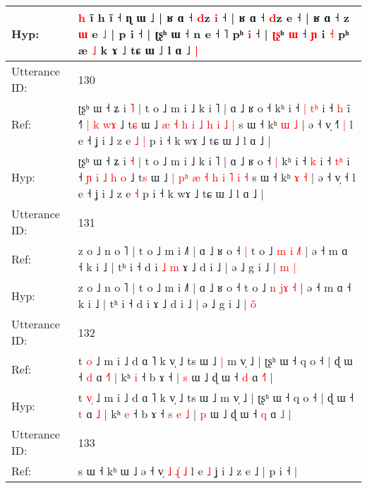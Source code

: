\documentclass[10pt]{article}
\DeclareRobustCommand{\hl}[1]{{\textcolor{red}{#1}}}
\begin{document}
\begin{longtable}{ll}
 \\
Hyp: & \hl{}\hl{h} i\hl{}\hl{}\hl{}\hl{}\hl{̃} h ĩ ˧ ɳ ɯ ˩ | ʁ ɑ ˧ \hl{d}z \hl{i} ˧ | ʁ ɑ ˧ \hl{d}z e ˧ | ʁ ɑ ˧ z\hl{ }\hl{ɯ} e \hl{˩} | p i ˧ | ʈʂʰ ɯ ˧ n e ˧\hl{}\hl{}\hl{}\hl{} ˥\hl{}\hl{} pʰ \hl{i} ˧\hl{} | \hl{ʈ}\hl{ʂ}ʰ \hl{}\hl{ɯ} ˧\hl{}\hl{}\hl{}\hl{} \hl{ɲ} i\hl{}\hl{} \hl{˧} pʰ æ\hl{}\hl{}\hl{} \hl{˩} k \hl{}ɤ ˩ tɕ ɯ ˩ l ɑ ˩\hl{ }\hl{|}
 \\
\midrule
Utterance ID: & 130 \\
Ref: & ʈʂʰ ɯ ˧ ʑ i \hl{˥} | t o ˩ m i ˩ k i ˥ | ɑ ˩ ʁ o ˧\hl{}\hl{} kʰ i ˧\hl{ }\hl{|} \hl{t}\hl{ʰ} i ˧ \hl{}\hl{h} i\hl{̃} ˧\hl{}\hl{˥} \hl{|} \hl{k} \hl{}\hl{w}\hl{ɤ} ˩ t\hl{ɕ} ɯ ˩ \hl{æ} \hl{}\hl{˧} \hl{h} \hl{i} \hl{˩} \hl{h} \hl{i} \hl{˩} \hl{|} s ɯ ˧ kʰ \hl{ɯ} \hl{˩} | ə ˧ v̩ ˧\hl{˥}\hl{ }\hl{|} l e ˧ ʝ i ˩ z e\hl{ }\hl{˩} \hl{|} p i ˧ k wɤ ˩ tɕ ɯ ˩ l ɑ ˩ |
 \\
Hyp: & ʈʂʰ ɯ ˧ ʑ i \hl{˧} | t o ˩ m i ˩ k i ˥ | ɑ ˩ ʁ o ˧\hl{ }\hl{|} kʰ i ˧\hl{}\hl{} \hl{}\hl{k} i ˧ \hl{t}\hl{ʰ} i\hl{} ˧\hl{ }\hl{ɲ} \hl{i} \hl{˩} \hl{h}\hl{ }\hl{o} ˩ t\hl{s} ɯ ˩ \hl{|} \hl{p}\hl{ʰ} \hl{æ} \hl{˧} \hl{h} \hl{i} \hl{˥} \hl{i} \hl{˧} s ɯ ˧ kʰ \hl{ɤ} \hl{˧} | ə ˧ v̩ ˧\hl{}\hl{}\hl{} l e ˧ ʝ i ˩ z e\hl{}\hl{} \hl{˧} p i ˧ k wɤ ˩ tɕ ɯ ˩ l ɑ ˩ |
 \\
\midrule
Utterance ID: & 131 \\
Ref: & z o ˩ n o ˥ | t o ˩ m i ˩˥ | ɑ ˩ ʁ o ˧\hl{ }\hl{|} t o ˩ \hl{m} \hl{i}\hl{ }\hl{˩}\hl{˥} | ə ˧ m ɑ ˧ k i ˩ | tʰ i ˧ d i\hl{ }\hl{˩}\hl{ }\hl{m} ɤ ˩ d i ˩ | ə ˩ g i ˩ | \hl{m}\hl{ }\hl{|}
 \\
Hyp: & z o ˩ n o ˥ | t o ˩ m i ˩˥ | ɑ ˩ ʁ o ˧\hl{}\hl{} t o ˩ \hl{n} \hl{j}\hl{ɤ}\hl{ }\hl{˧} | ə ˧ m ɑ ˧ k i ˩ | tʰ i ˧ d i\hl{}\hl{}\hl{}\hl{} ɤ ˩ d i ˩ | ə ˩ g i ˩ | \hl{}\hl{o}\hl{̃}
 \\
\midrule
Utterance ID: & 132 \\
Ref: & t \hl{}\hl{o} ˩ m i ˩ d ɑ ˥ k v̩ ˩ ts ɯ ˩\hl{ }\hl{|} m v̩ ˩ | ʈʂʰ ɯ ˧ q o ˧ | ɖ ɯ ˧ \hl{d} ɑ \hl{˧}\hl{˥} | kʰ \hl{i} ˧ b ɤ ˧\hl{}\hl{}\hl{}\hl{}\hl{}\hl{} | \hl{s} ɯ ˩ ɖ ɯ ˧ \hl{d} ɑ \hl{˧}\hl{˥} |
 \\
Hyp: & t \hl{v}\hl{̩} ˩ m i ˩ d ɑ ˥ k v̩ ˩ ts ɯ ˩\hl{}\hl{} m v̩ ˩ | ʈʂʰ ɯ ˧ q o ˧ | ɖ ɯ ˧ \hl{t} ɑ \hl{}\hl{˩} | kʰ \hl{e} ˧ b ɤ ˧\hl{ }\hl{s}\hl{ }\hl{e}\hl{ }\hl{˩} | \hl{p} ɯ ˩ ɖ ɯ ˧ \hl{q} ɑ \hl{}\hl{˩} |
 \\
\midrule
Utterance ID: & 133 \\
Ref: & s ɯ ˧ kʰ ɯ ˩ ə ˧ v̩\hl{ }\hl{˩} \hl{ɻ}\hl{̍} \hl{˩} l e \hl{˩} ʝ i ˩ z e ˩ | p i ˧ |

\end{longtable}
\end{document}
